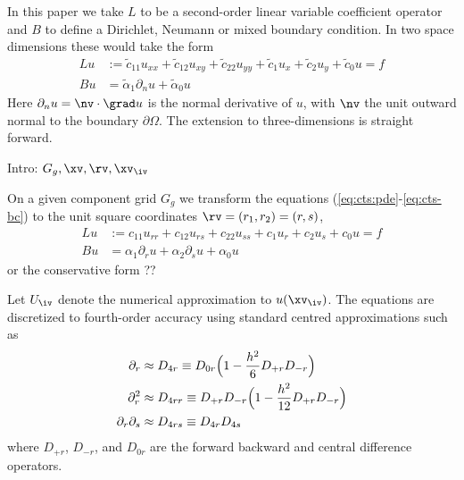 \documentclass{article}
\begin{document}
\newcommand{\ct}{\tilde{c}}
\newcommand{\alphat}{\tilde{\alpha}}
In this paper we take $L$ to be a second-order linear variable coefficient operator
and $B$ to define a Dirichlet, Neumann or mixed boundary condition. In two space dimensions these would
take the form
\begin{align}
   L u &:= \ct_{11} u_{xx} + \ct_{12} u_{xy} + \ct_{22} u_{yy} 
                     + \ct_1 u_x + \ct_2 u_y + \ct_0 u = f \label{eq:cts-pde} \\
   Bu &= \alphat_1 \partial_n u + \alphat_0 u             \label{eq:cts-bc}
\end{align}
Here $\partial_n u=\nv\cdot\grad u$ is the normal derivative of $u$, with $\nv$ the unit outward
normal to the boundary $\partial\Omega$. The extension to three-dimensions is straight forward.


Intro: $G_g, \xv,\rv, \xv_\iv$

On a given component grid $G_g$ we transform the equations (\ref{eq:cts:pde}-\ref{eq:cts-bc})
to the unit square coordinates $\rv=(r_1,r_2)=(r,s)$,
\begin{align}
    L u &:= c_{11} u_{rr} + c_{12} u_{rs} + c_{22} u_{ss} 
                     + c_1 u_r + c_2 u_s + c_0 u = f \label{eq:cts-pde} \\
   Bu &= \alpha_1 \partial_r u + \alpha_2 \partial_s u + \alpha_0 u             \label{eq:cts-bc-r}
\end{align}
or the conservative form ??

Let $U_\iv$ denote the numerical approximation to $u(\xv_\iv)$.
The equations are discretized to fourth-order accuracy using standard
centred approximations such as
\begin{align} 
  \partial_r &\approx D_{4r} \equiv D_{0r}\Big( 1 - {h^2\over6} D_{+r}D_{-r}\Big) \\
  \partial_r^2 &\approx D_{4rr} \equiv D_{+r}D_{-r}\Big( 1 - {h^2\over12} D_{+r}D_{-r}\Big) \\
  \partial_r\partial_s &\approx D_{4rs} \equiv D_{4r}D_{4s}
\end{align}
where $D_{+r}$, $D_{-r}$, and $D_{0r}$ are the forward backward and central difference operators.
\end{document}
